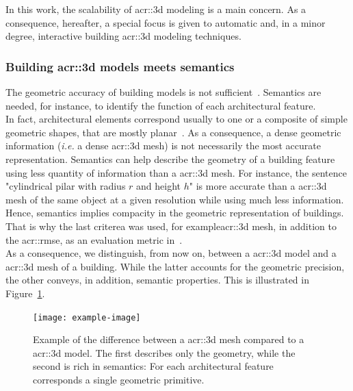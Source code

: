             In this work, the scalability of \gls{acr::3d} modeling is a main concern.
            As a consequence, hereafter, a special focus is given to automatic and, in a minor degree, interactive building \gls{acr::3d} modeling techniques.

        \subsubsection{Building \gls*{acr::3d} models meets semantics}
            The geometric accuracy of building models is not sufficient~\parencite{biljecki2016improved}.
            Semantics are needed, for instance, to identify the function of each architectural feature.\\
            In fact, architectural elements correspond usually to one or a composite of simple geometric shapes, that are mostly planar~\parencite{kolbe2005citygml}.
            As a consequence, a dense geometric information (\textit{i.e.} a dense \gls{acr::3d} mesh) is not necessarily the most accurate representation.
            Semantics can help describe the geometry of a building feature using less quantity of information than a \gls{acr::3d} mesh.
            For instance, the sentence "cylindrical pilar with radius $r$ and height $h$" is more accurate than a \gls{acr::3d} mesh of the same object at a given resolution while using much less information.
            Hence, semantics implies compacity in the geometric representation of buildings.
            That is why the last criterea was used, for example\gls{acr::3d} mesh, in addition to the \gls{acr::rmse}, as an evaluation metric in~\textcite{lafarge_ijcv12}.\\
            As a consequence, we distinguish, from now on, between a \gls{acr::3d} model and a \gls{acr::3d} mesh of a building.
            While the latter accounts for the geometric precision, the other conveys, in addition, semantic properties.
            This is illustrated in Figure~\ref{fig::3dmodel_vs_3dmesh}.\\

            \begin{figure}[htpb]
                \centering
                \texttt{[image: example-image]}            
                \caption{
                    \label{fig::3dmodel_vs_3dmesh} Example of the difference between a \gls{acr::3d} mesh compared to a \gls{acr::3d} model.
                    The first describes only the geometry, while the second is rich in semantics:
                    For each architectural feature corresponds a single geometric primitive.
                }
            \end{figure}
            
